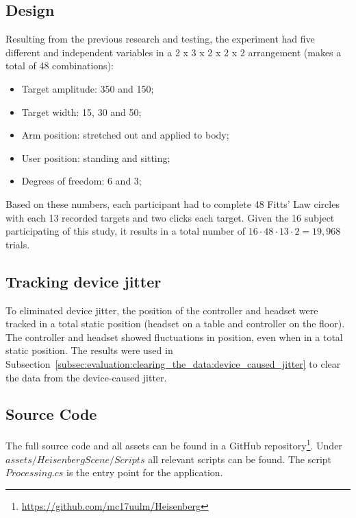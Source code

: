\subsection{Design}
\label{subsec:design}

Resulting from the previous research and testing, the experiment had five different and independent variables in a 2 x 3 x 2 x 2 x 2 arrangement (makes a total of 48 combinations):

\begin{itemize}
    \item Target amplitude: 350 and 150;
    \item Target width: 15, 30 and 50;
    \item Arm position: stretched out and applied to body;
    \item User position: standing and sitting;
    \item Degrees of freedom: 6 and 3;
\end{itemize}

Based on these numbers, each participant had to complete 48 Fitts' Law circles with each 13 recorded targets and two clicks each target. Given the 16 subject participating of this study, it results in a total number of $16 \cdot 48 \cdot 13 \cdot 2 = 19,968$ trials.

\subsection{Tracking device jitter}
\label{subsec:basic_jitter}

To eliminated device jitter, the position of the controller and headset were tracked in a total static position (headset on a table and controller on the floor). The controller and headset showed fluctuations in position, even when in a total static position. The results were used in Subsection~\ref{subsec:evaluation:clearing_the_data:device_caused_jitter} to clear the data from the device-caused jitter.

\subsection{Source Code}
\label{subsec:source_code}

The full source code and all assets can be found in a GitHub repository\footnote{\url{https://github.com/mc17uulm/Heisenberg}}. Under $assets/HeisenbergScene/Scripts$ all relevant scripts can be found. The script $Processing.cs$ is the entry point for the application.

